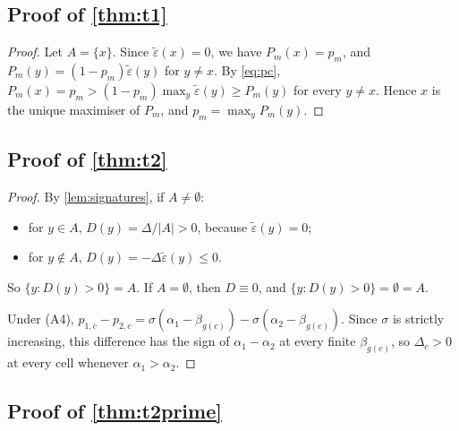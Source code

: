 \subsection{Proof of \cref{thm:t1}}

\begin{proof}
Let $A=\{x\}$. Since $\tilde\varepsilon(x)=0$, we have $P_m(x)=p_m$, and $P_m(y)=(1-p_m)\tilde\varepsilon(y)$ for $y\neq x$. By \eqref{eq:pc}, $P_m(x)=p_m>(1-p_m)\max_y\tilde\varepsilon(y)\ge P_m(y)$ for every $y\neq x$. Hence $x$ is the unique maximiser of $P_m$, and $p_m=\max_yP_m(y)$.
\end{proof}

\subsection{Proof of \cref{thm:t2}}

\begin{proof}
By \cref{lem:signatures}, if $A\neq\emptyset$:
\begin{itemize}[leftmargin=*]
\item for $y\in A$, $D(y)=\Delta/|A|>0$, because $\tilde\varepsilon(y)=0$;
\item for $y\notin A$, $D(y)=-\Delta\tilde\varepsilon(y)\le0$.
\end{itemize}
So $\{y:D(y)>0\}=A$. If $A=\emptyset$, then $D\equiv0$, and $\{y:D(y)>0\}=\emptyset=A$.

Under (A4), $p_{1,c}-p_{2,c}=\sigma(\alpha_1-\beta_{g(c)})-\sigma(\alpha_2-\beta_{g(c)})$. Since $\sigma$ is strictly increasing, this difference has the sign of $\alpha_1-\alpha_2$ at every finite $\beta_{g(c)}$, so $\Delta_c>0$ at every cell whenever $\alpha_1>\alpha_2$.
\end{proof}

\subsection{Proof of \cref{thm:t2prime}}


